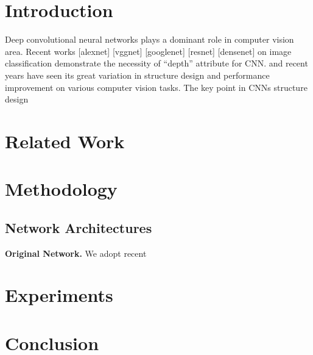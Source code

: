 \documentclass[10pt,twocolumn,letterpaper]{article}
\begin{document}
\section{Introduction}
	Deep convolutional neural networks plays a dominant role in computer vision area. Recent works [alexnet] [vggnet] [googlenet] [resnet] [densenet] on image classification demonstrate the necessity of ``depth'' attribute for CNN.
	and	recent years have seen its great variation in structure design and performance improvement on various computer vision tasks. The key point in CNNs structure design
	 
\section{Related Work}
\section{Methodology}

\subsection{Network Architectures}
\noindent \textbf{Original Network.} We adopt recent  



\section{Experiments}
\section{Conclusion}

{\small


}
\end{document}
